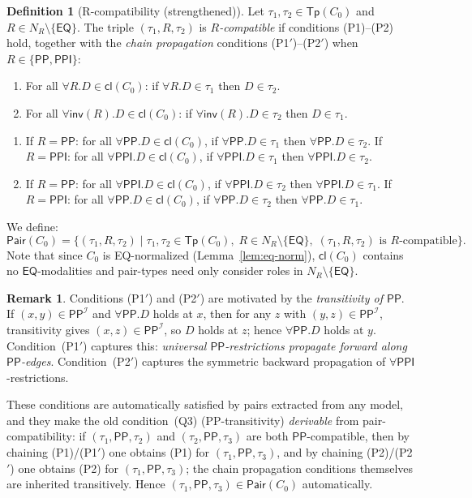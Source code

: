 \documentclass[a4paper,11pt]{article}
\theoremstyle{definition}
\newtheorem{definition}[theorem]{Definition}
\newtheorem{remark}[theorem]{Remark}
\newcommand{\NR}{\ensuremath{N_R}}
\newcommand{\interp}{\ensuremath{\mathcal{I}}}
\newcommand{\EQ}{\ensuremath{\mathsf{EQ}}}
\newcommand{\PP}{\ensuremath{\mathsf{PP}}}
\newcommand{\PPI}{\ensuremath{\mathsf{PPI}}}
\newcommand{\inv}{\ensuremath{\mathsf{inv}}}
\newcommand{\cl}{\ensuremath{\mathsf{cl}}}
\newcommand{\Tp}{\ensuremath{\mathsf{Tp}}}
\newcommand{\Pair}{\ensuremath{\mathsf{Pair}}}
\begin{document}
\begin{definition}[R-compatibility (strengthened)]
\label{def:compat}
Let $\tau_1, \tau_2 \in \Tp(C_0)$ and $R \in \NR \setminus \{\EQ\}$.
The triple $(\tau_1, R, \tau_2)$ is \emph{$R$-compatible} if conditions
(P1)--(P2) hold, together with the \emph{chain propagation} conditions
(P1$'$)--(P2$'$) when $R \in \{\PP, \PPI\}$:
\begin{enumerate}[label=(P\arabic*),nosep]
  \item For all $\forall R.D \in \cl(C_0)$: if $\forall R.D \in
    \tau_1$ then $D \in \tau_2$.
  \item For all $\forall \inv(R).D \in \cl(C_0)$: if $\forall
    \inv(R).D \in \tau_2$ then $D \in \tau_1$.
\end{enumerate}
\begin{enumerate}[label=(P\arabic*$'$),nosep]
  \item If $R = \PP$: for all $\forall \PP.D \in \cl(C_0)$, if
    $\forall \PP.D \in \tau_1$ then $\forall \PP.D \in \tau_2$.
    \newline
    If $R = \PPI$: for all $\forall \PPI.D \in \cl(C_0)$, if
    $\forall \PPI.D \in \tau_1$ then $\forall \PPI.D \in \tau_2$.
  \item If $R = \PP$: for all $\forall \PPI.D \in \cl(C_0)$, if
    $\forall \PPI.D \in \tau_2$ then $\forall \PPI.D \in \tau_1$.
    \newline
    If $R = \PPI$: for all $\forall \PP.D \in \cl(C_0)$, if
    $\forall \PP.D \in \tau_2$ then $\forall \PP.D \in \tau_1$.
\end{enumerate}
We define:
\[
  \Pair(C_0) = \{(\tau_1, R, \tau_2) \mid
    \tau_1, \tau_2 \in \Tp(C_0),\;
    R \in \NR \setminus \{\EQ\},\;
    (\tau_1, R, \tau_2) \text{ is $R$-compatible}\}.
\]
Note that since $C_0$ is EQ-normalized (Lemma~\ref{lem:eq-norm}),
$\cl(C_0)$ contains no $\EQ$-modalities and pair-types need only
consider roles in $\NR \setminus \{\EQ\}$.
\end{definition}

\begin{remark}
Conditions (P1$'$) and (P2$'$) are motivated by the \emph{transitivity
of $\PP$}.  If $(x,y) \in \PP^{\interp}$ and $\forall \PP.D$ holds at
$x$, then for any $z$ with $(y,z) \in \PP^{\interp}$, transitivity
gives $(x,z) \in \PP^{\interp}$, so $D$ holds at $z$; hence $\forall
\PP.D$ holds at $y$.  Condition~(P1$'$) captures this:
\emph{universal $\PP$-restrictions propagate forward along
$\PP$-edges}.  Condition~(P2$'$) captures the symmetric backward
propagation of $\forall \PPI$-restrictions.

These conditions are automatically satisfied by pairs extracted from
any model, and they make the old condition~(Q3) (PP-transitivity)
\emph{derivable} from pair-compatibility: if $(\tau_1, \PP, \tau_2)$
and $(\tau_2, \PP, \tau_3)$ are both $\PP$-compatible, then by
chaining (P1)/(P1$'$) one obtains (P1) for $(\tau_1, \PP, \tau_3)$,
and by chaining (P2)/(P2$'$) one obtains (P2) for $(\tau_1, \PP,
\tau_3)$; the chain propagation conditions themselves are inherited
transitively.  Hence $(\tau_1, \PP, \tau_3) \in \Pair(C_0)$
automatically.
\end{remark}
\end{document}
